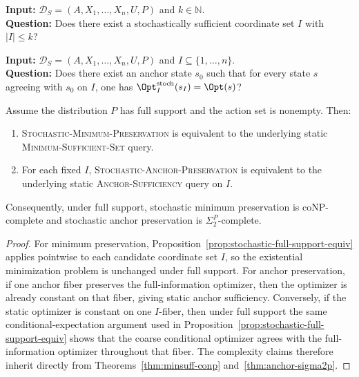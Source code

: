 \begin{problem}\label{prob:stochastic-minimum-preservation}
\textbf{Input:} $\mathcal{D}_S=(A,X_1,\ldots,X_n,U,P)$ and $k\in\mathbb{N}$. \\
\textbf{Question:} Does there exist a stochastically sufficient coordinate set $I$ with $|I|\le k$?
\end{problem}

\begin{problem}\label{prob:stochastic-anchor-preservation}
\textbf{Input:} $\mathcal{D}_S=(A,X_1,\ldots,X_n,U,P)$ and $I\subseteq\{1,\ldots,n\}$. \\
\textbf{Question:} Does there exist an anchor state $s_0$ such that for every state $s$ agreeing with $s_0$ on $I$, one has $\Opt^{\mathrm{stoch}}_I(s_I)=\Opt(s)$?
\end{problem}

\begin{theorem}\label{thm:stochastic-preservation-full-support-variants}
Assume the distribution $P$ has full support and the action set is nonempty.
Then:
\begin{enumerate}
\item \textsc{Stochastic-Minimum-Preservation} is equivalent to the underlying static \textsc{Minimum-Sufficient-Set} query.
\item For each fixed $I$, \textsc{Stochastic-Anchor-Preservation} is equivalent to the underlying static \textsc{Anchor-Sufficiency} query on $I$.
\end{enumerate}
Consequently, under full support, stochastic minimum preservation is coNP-complete and stochastic anchor preservation is $\Sigma_2^P$-complete.
\end{theorem}

\begin{proof}
For minimum preservation, Proposition~\ref{prop:stochastic-full-support-equiv} applies pointwise to each candidate coordinate set $I$, so the existential minimization problem is unchanged under full support. For anchor preservation, if one anchor fiber preserves the full-information optimizer, then the optimizer is already constant on that fiber, giving static anchor sufficiency. Conversely, if the static optimizer is constant on one $I$-fiber, then under full support the same conditional-expectation argument used in Proposition~\ref{prop:stochastic-full-support-equiv} shows that the coarse conditional optimizer agrees with the full-information optimizer throughout that fiber. The complexity claims therefore inherit directly from Theorems~\ref{thm:minsuff-conp} and~\ref{thm:anchor-sigma2p}.
\end{proof}

